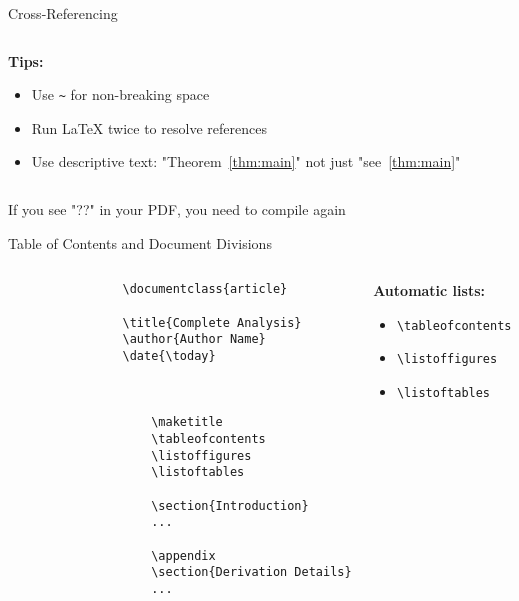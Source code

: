 \begin{frame}[fragile]{Cross-Referencing}
\begin{columns}
\begin{column}{0.5\textwidth}
			\textbf{Tips:}
			\begin{itemize}
				\item Use \texttt{\textasciitilde} for non-breaking space
				\item Run LaTeX twice to resolve references
				\item Use descriptive text: "Theorem~\ref{thm:main}" not just "see~\ref{thm:main}"
			\end{itemize}
		\end{column}
	\end{columns}
	
	\begin{warning}
		If you see "??" in your PDF, you need to compile again
	\end{warning}
\end{frame}

\begin{frame}[fragile]{Table of Contents and Document Divisions}
	\begin{columns}
		\begin{column}{0.5\textwidth}
			\begin{lstlisting}
				\documentclass{article}
				
				\title{Complete Analysis}
				\author{Author Name}
				\date{\today}
				
				
					
					\maketitle
					\tableofcontents
					\listoffigures
					\listoftables
					
					\section{Introduction}
					...
					
					\appendix
					\section{Derivation Details}
					...
					
				
			\end{lstlisting}
		\end{column}
		
		\begin{column}{0.5\textwidth}
			\textbf{Automatic lists:}
			\begin{itemize}
				\item \texttt{\textbackslash tableofcontents}
				\item \texttt{\textbackslash listoffigures}
				\item \texttt{\textbackslash listoftables}
			\end{itemize}
			

\end{column}
\end{columns}
\end{frame}
